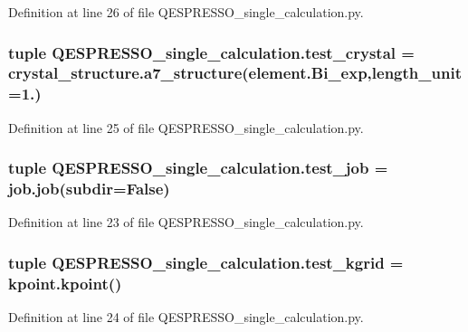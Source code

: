 Definition at line 26 of file Q\+E\+S\+P\+R\+E\+S\+S\+O\+\_\+single\+\_\+calculation.\+py.

\hypertarget{namespace_q_e_s_p_r_e_s_s_o__single__calculation_a2cc42834e4bbe26321c1db9ae0912a07}{
\subsubsection[{test\+\_\+crystal}]{\setlength{\rightskip}{0pt plus 5cm}tuple Q\+E\+S\+P\+R\+E\+S\+S\+O\+\_\+single\+\_\+calculation.\+test\+\_\+crystal = crystal\+\_\+structure.\+a7\+\_\+structure(element.\+Bi\+\_\+exp,length\+\_\+unit=1.)}}\label{namespace_q_e_s_p_r_e_s_s_o__single__calculation_a2cc42834e4bbe26321c1db9ae0912a07}


Definition at line 25 of file Q\+E\+S\+P\+R\+E\+S\+S\+O\+\_\+single\+\_\+calculation.\+py.

\hypertarget{namespace_q_e_s_p_r_e_s_s_o__single__calculation_a0aec7de6320a65be3f19d8d0653735bf}{
\subsubsection[{test\+\_\+job}]{\setlength{\rightskip}{0pt plus 5cm}tuple Q\+E\+S\+P\+R\+E\+S\+S\+O\+\_\+single\+\_\+calculation.\+test\+\_\+job = job.\+job(subdir=False)}}\label{namespace_q_e_s_p_r_e_s_s_o__single__calculation_a0aec7de6320a65be3f19d8d0653735bf}


Definition at line 23 of file Q\+E\+S\+P\+R\+E\+S\+S\+O\+\_\+single\+\_\+calculation.\+py.

\hypertarget{namespace_q_e_s_p_r_e_s_s_o__single__calculation_a7968ed452bf455990eab8181fa5cb393}{
\subsubsection[{test\+\_\+kgrid}]{\setlength{\rightskip}{0pt plus 5cm}tuple Q\+E\+S\+P\+R\+E\+S\+S\+O\+\_\+single\+\_\+calculation.\+test\+\_\+kgrid = kpoint.\+kpoint()}}\label{namespace_q_e_s_p_r_e_s_s_o__single__calculation_a7968ed452bf455990eab8181fa5cb393}


Definition at line 24 of file Q\+E\+S\+P\+R\+E\+S\+S\+O\+\_\+single\+\_\+calculation.\+py.

